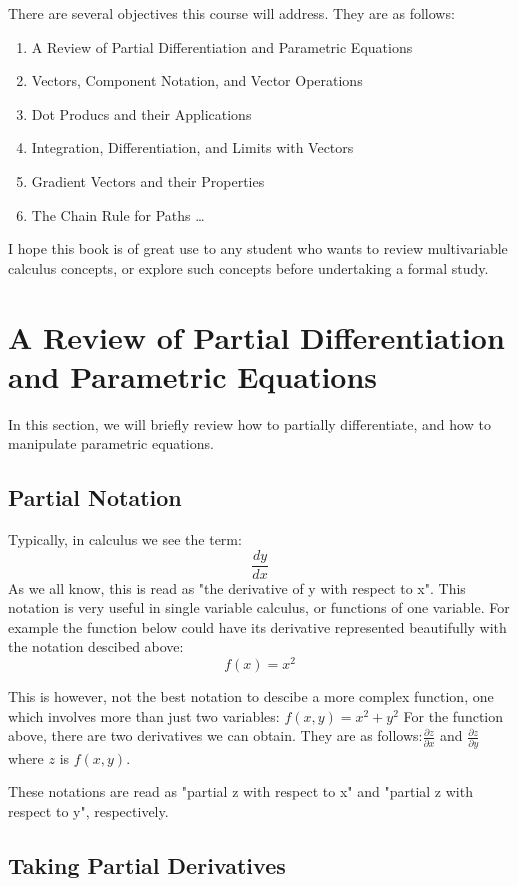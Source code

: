\documentclass[12pt]{article}
\begin{document}
There are several objectives this course will address. They are as follows:

\begin{enumerate}
\item A Review of Partial Differentiation and Parametric Equations
\item Vectors, Component Notation, and Vector Operations
\item Dot Producs and their Applications
\item Integration, Differentiation, and Limits with Vectors
\item Gradient Vectors and their Properties
\item The Chain Rule for Paths
\dots
\end{enumerate}

I hope this book is of great use to any student who wants to review multivariable calculus concepts, or explore such concepts before undertaking a formal study.

\section{A Review of Partial Differentiation and Parametric Equations}

In this section, we will briefly review how to partially differentiate, and how to manipulate parametric equations.

\subsection{Partial Notation}

Typically, in calculus we see the term: $$\frac { dy }{ dx } $$
As we all know, this is read as "the derivative of y with respect to x".
This notation is very useful in single variable calculus, or functions of one variable. For example the function below could have its derivative represented beautifully with the notation descibed above: $$f(x) = x^2$$

This is however, not the best notation to descibe a more complex function, one which involves more than just two variables: $f(x,y) = x^2 + y^2$
For the function above, there are two derivatives we can obtain. They are as follows:$\frac { \partial z }{ \partial x } $ and $\frac { \partial z }{ \partial y } $ where $z$ is $f(x,y)$.

These notations are read as "partial z with respect to x" and "partial z with respect to y", respectively.

\subsection{Taking Partial Derivatives}
\end{document}
